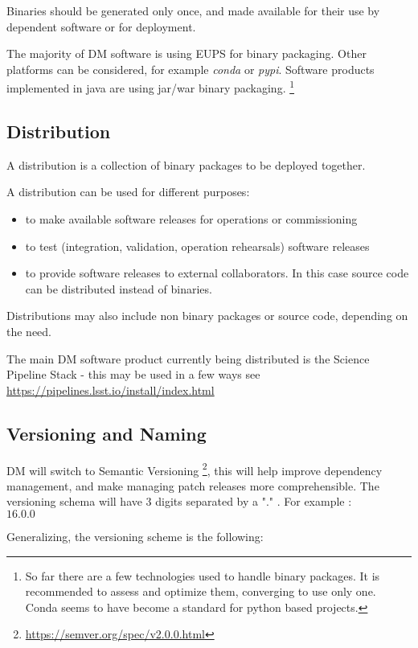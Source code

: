 Binaries should be generated only once, and made available for their use by dependent software or for deployment.

The majority of DM software is using EUPS for binary packaging. Other platforms can be considered, for example \textit{conda} or \textit{pypi}.
Software products implemented in java are using jar/war binary packaging.
\footnote{So far there are a few technologies used to handle binary packages. It is recommended to assess and optimize them, converging to use only one.
Conda seems to have become a standard for python based projects.}

\subsection{Distribution} \label{sec:distribution}

A distribution is a collection of binary packages to be deployed together.

A distribution can be used for different purposes:

\begin{itemize}
\item to make available software releases for operations or commissioning
\item to test (integration, validation, operation rehearsals) software releases
\item to provide software releases to external collaborators. In this case source code can be distributed instead of binaries.
\end{itemize}

Distributions may also include non binary packages or source code, depending on the need.

The main DM software product currently being distributed is the Science Pipeline Stack -
this may be used in a few ways see \url{https://pipelines.lsst.io/install/index.html}


\newpage
\subsection{Versioning and Naming} \label{sec:versioning}
DM will  switch to Semantic Versioning \footnote{\url{https://semver.org/spec/v2.0.0.html}},  this will help improve dependency management, and make  managing patch releases more comprehensible.
The versioning schema will have 3 digits separated by a "." . For example :
\\
$16.0.0$

Generalizing, the versioning scheme is the following:

